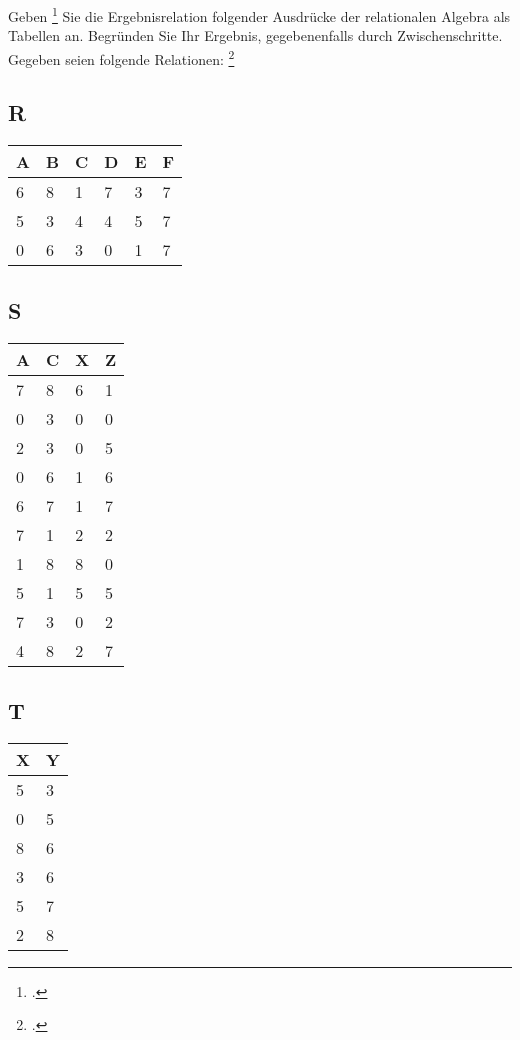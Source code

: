 \documentclass{bschlangaul-aufgabe}
\begin{document}

Geben \footcite{examen:46116:2018:09} Sie die
Ergebnisrelation folgender Ausdrücke der relationalen Algebra als
Tabellen an. Begründen Sie Ihr Ergebnis, gegebenenfalls durch
Zwischenschritte. Gegeben seien folgende Relationen:
\footcite[Seite 1, Aufgabe 1]{db:ab:3}

\bigskip

\begin{minipage}[t]{5cm}
\subsection*{R}
\begin{tabular}{llllll}
A & B & C & D & E & F \\\hline
6 & 8 & 1 & 7 & 3 & 7 \\
5 & 3 & 4 & 4 & 5 & 7 \\
0 & 6 & 3 & 0 & 1 & 7
\end{tabular}
\end{minipage}
%
\begin{minipage}[t]{3.8cm}
\subsection*{S}
\begin{tabular}{llll}
A & C & X & Z \\\hline
7 & 8 & 6 & 1 \\
0 & 3 & 0 & 0 \\
2 & 3 & 0 & 5 \\
0 & 6 & 1 & 6 \\
6 & 7 & 1 & 7 \\
7 & 1 & 2 & 2 \\
1 & 8 & 8 & 0 \\
5 & 1 & 5 & 5 \\
7 & 3 & 0 & 2 \\
4 & 8 & 2 & 7 \\
\end{tabular}
\end{minipage}
%
\begin{minipage}[t]{2cm}
\subsection*{T}
\begin{tabular}{ll}
X & Y \\\hline
5 & 3 \\
0 & 5 \\
8 & 6 \\
3 & 6 \\
5 & 7 \\
2 & 8 \\
\end{tabular}
\end{minipage}
\end{document}
